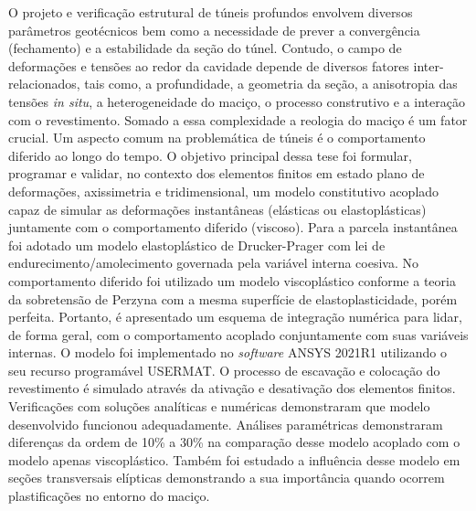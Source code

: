 O projeto e verificação estrutural de túneis profundos envolvem diversos parâmetros geotécnicos bem como a necessidade de prever a convergência (fechamento) e a estabilidade da seção do túnel. Contudo, o campo de deformações e tensões ao redor da cavidade depende de diversos fatores inter-relacionados, tais como, a profundidade, a geometria da seção, a anisotropia das tensões \textit{in situ}, a heterogeneidade do maciço, o processo construtivo e a interação com o revestimento. Somado a essa complexidade a reologia do maciço é um fator crucial. Um aspecto comum na problemática de túneis é o comportamento diferido ao longo do tempo. O objetivo principal dessa tese foi formular, programar e validar, no contexto dos elementos finitos em estado plano de deformações, axissimetria e tridimensional, um modelo constitutivo acoplado capaz de simular as deformações instantâneas (elásticas ou elastoplásticas) juntamente com o comportamento diferido (viscoso). Para a parcela instantânea foi adotado um modelo elastoplástico de Drucker-Prager com lei de endurecimento/amolecimento governada pela variável interna coesiva. No comportamento diferido foi utilizado um modelo viscoplástico conforme a teoria da sobretensão de Perzyna com a mesma superfície de elastoplasticidade, porém perfeita. Portanto, é apresentado um esquema de integração numérica para lidar, de forma geral, com o comportamento acoplado conjuntamente com suas variáveis internas. O modelo foi implementado no \textit{software} ANSYS 2021R1 utilizando o seu recurso programável USERMAT. O processo de escavação e colocação do revestimento é simulado através da ativação e desativação dos elementos finitos. Verificações com soluções analíticas e numéricas demonstraram que modelo desenvolvido funcionou adequadamente. Análises paramétricas demonstraram diferenças da ordem de 10\% a 30\% na comparação desse modelo acoplado com o modelo apenas viscoplástico. Também foi estudado a influência desse modelo em seções transversais elípticas demonstrando a sua importância quando ocorrem plastificações no entorno do maciço.